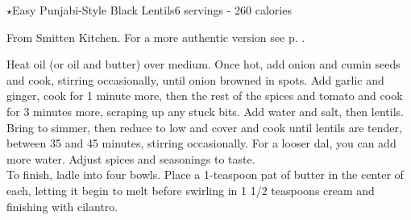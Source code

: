 \begin{recipe}{\texorpdfstring{$\star$}{str}Easy Punjabi-Style Black Lentils}{6 servings - 260 calories}{}

\freeform From Smitten Kitchen. For a more authentic version see p. \pageref{main:dal_makhani}.


Heat oil (or oil and butter) over medium. Once hot, add onion and cumin seeds and cook, stirring occasionally, until onion browned in spots. Add garlic and ginger, cook for 1 minute more, then the rest of the spices and tomato and cook for 3 minutes more, scraping up any stuck bits. Add water and salt, then lentils. Bring to simmer, then reduce to low and cover and cook until lentils are tender, between 35 and 45 minutes, stirring occasionally. For a looser dal, you can add more water. Adjust spices and seasonings to taste.\\

To finish, ladle into four bowls. Place a 1-teaspoon pat of butter in the center of each, letting it begin to melt before swirling in 1 1/2 teaspoons cream and finishing with cilantro.

\end{recipe}